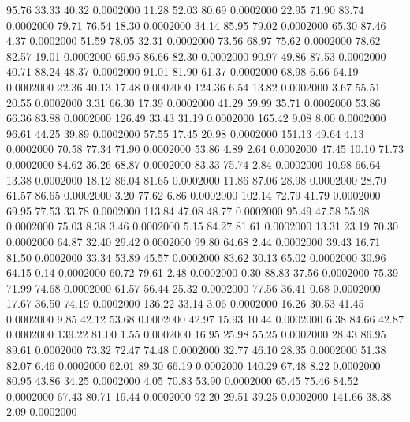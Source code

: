   95.76   33.33   40.32   0.0002000
  11.28   52.03   80.69   0.0002000
  22.95   71.90   83.74   0.0002000
  79.71   76.54   18.30   0.0002000
  34.14   85.95   79.02   0.0002000
  65.30   87.46    4.37   0.0002000
  51.59   78.05   32.31   0.0002000
  73.56   68.97   75.62   0.0002000
  78.62   82.57   19.01   0.0002000
  69.95   86.66   82.30   0.0002000
  90.97   49.86   87.53   0.0002000
  40.71   88.24   48.37   0.0002000
  91.01   81.90   61.37   0.0002000
  68.98    6.66   64.19   0.0002000
  22.36   40.13   17.48   0.0002000
 124.36    6.54   13.82   0.0002000
   3.67   55.51   20.55   0.0002000
   3.31   66.30   17.39   0.0002000
  41.29   59.99   35.71   0.0002000
  53.86   66.36   83.88   0.0002000
 126.49   33.43   31.19   0.0002000
 165.42    9.08    8.00   0.0002000
  96.61   44.25   39.89   0.0002000
  57.55   17.45   20.98   0.0002000
 151.13   49.64    4.13   0.0002000
  70.58   77.34   71.90   0.0002000
  53.86    4.89    2.64   0.0002000
  47.45   10.10   71.73   0.0002000
  84.62   36.26   68.87   0.0002000
  83.33   75.74    2.84   0.0002000
  10.98   66.64   13.38   0.0002000
  18.12   86.04   81.65   0.0002000
  11.86   87.06   28.98   0.0002000
  28.70   61.57   86.65   0.0002000
   3.20   77.62    6.86   0.0002000
 102.14   72.79   41.79   0.0002000
  69.95   77.53   33.78   0.0002000
 113.84   47.08   48.77   0.0002000
  95.49   47.58   55.98   0.0002000
  75.03    8.38    3.46   0.0002000
   5.15   84.27   81.61   0.0002000
  13.31   23.19   70.30   0.0002000
  64.87   32.40   29.42   0.0002000
  99.80   64.68    2.44   0.0002000
  39.43   16.71   81.50   0.0002000
  33.34   53.89   45.57   0.0002000
  83.62   30.13   65.02   0.0002000
  30.96   64.15    0.14   0.0002000
  60.72   79.61    2.48   0.0002000
   0.30   88.83   37.56   0.0002000
  75.39   71.99   74.68   0.0002000
  61.57   56.44   25.32   0.0002000
  77.56   36.41    0.68   0.0002000
  17.67   36.50   74.19   0.0002000
 136.22   33.14    3.06   0.0002000
  16.26   30.53   41.45   0.0002000
   9.85   42.12   53.68   0.0002000
  42.97   15.93   10.44   0.0002000
   6.38   84.66   42.87   0.0002000
 139.22   81.00    1.55   0.0002000
  16.95   25.98   55.25   0.0002000
  28.43   86.95   89.61   0.0002000
  73.32   72.47   74.48   0.0002000
  32.77   46.10   28.35   0.0002000
  51.38   82.07    6.46   0.0002000
  62.01   89.30   66.19   0.0002000
 140.29   67.48    8.22   0.0002000
  80.95   43.86   34.25   0.0002000
   4.05   70.83   53.90   0.0002000
  65.45   75.46   84.52   0.0002000
  67.43   80.71   19.44   0.0002000
  92.20   29.51   39.25   0.0002000
 141.66   38.38    2.09   0.0002000
